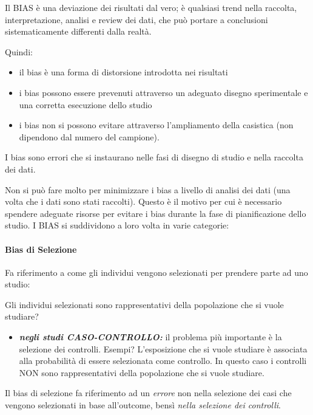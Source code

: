 Il BIAS è una deviazione dei risultati dal vero; è qualsiasi trend nella raccolta, interpretazione, analisi e review dei dati, che può portare a conclusioni sistematicamente differenti dalla realtà.

Quindi:

\begin{itemize}
\item
  il bias è una forma di distorsione introdotta nei risultati
\item
  i bias possono essere prevenuti attraverso un adeguato disegno sperimentale e una corretta esecuzione dello studio
\item
  i bias non si possono evitare attraverso l'ampliamento della casistica (non dipendono dal numero del campione).
\end{itemize}

I bias sono errori che si instaurano nelle fasi di disegno di studio e nella raccolta dei dati.

Non si può fare molto per minimizzare i bias a livello di analisi dei dati (una volta che i dati sono stati raccolti). Questo è il motivo per cui è necessario spendere adeguate risorse per evitare i bias durante la fase di pianificazione dello studio. I BIAS si suddividono a loro volta in varie categorie:

\paragraph{Bias di Selezione}

Fa riferimento a come gli individui vengono selezionati per prendere parte ad uno studio:

Gli individui selezionati sono rappresentativi della popolazione che si vuole studiare?

\begin{itemize}
\item
  \textbf{\emph{negli studi CASO-CONTROLLO:}} il problema più importante è la selezione dei controlli. Esempi? L'esposizione che si vuole studiare è associata alla probabilità di essere selezionata come controllo. In questo caso i controlli NON sono rappresentativi della popolazione che si vuole studiare.
\end{itemize}

Il bias di selezione fa riferimento ad un \emph{errore} non nella selezione dei casi che vengono selezionati in base all'outcome, bensì \emph{nella selezione dei controlli}.

